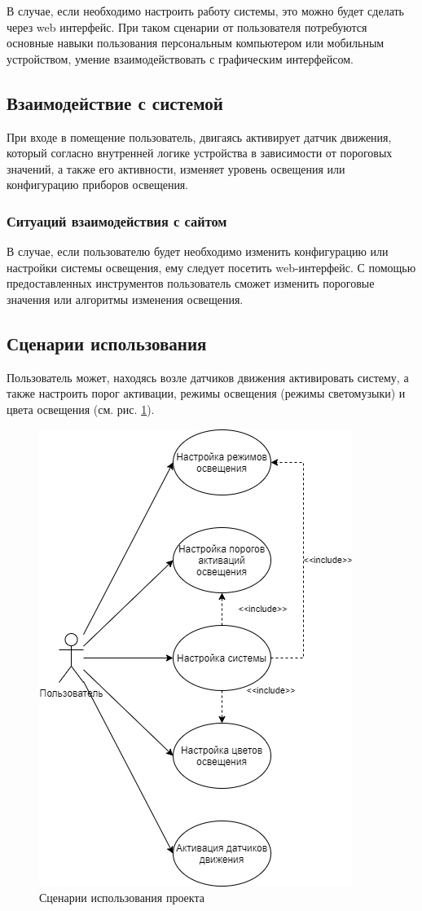 \documentclass[a4paper,14pt]{extarticle}
\begin{document}
В случае, если необходимо настроить работу системы, это можно будет сделать через web интерфейс. При таком сценарии от пользователя потребуются основные навыки пользования персональным компьютером или мобильным устройством, умение взаимодействовать с графическим интерфейсом.
\subsection{Взаимодействие с системой}

При входе в помещение пользователь, двигаясь активирует датчик движения, который согласно внутренней логике устройства в зависимости от пороговых значений, а также его активности, изменяет уровень освещения или конфигурацию приборов освещения.

\subsubsection*{Ситуаций взаимодействия с сайтом}
В случае, если пользователю будет необходимо изменить конфигурацию или настройки системы освещения, ему следует посетить web-интерфейс. С помощью предоставленных инструментов пользователь сможет изменить пороговые значения или алгоритмы изменения освещения.

\subsection{Сценарии использования}
Пользователь может, находясь возле датчиков движения активировать систему, а также настроить порог активации, режимы освещения (режимы светомузыки) и цвета освещения (см. рис. \ref{fig:usecase}).

\begin{figure}[htbp]
	\centering
	\includegraphics[width=0.5\linewidth]{images/usecase}
	\caption{Сценарии использования проекта}
	\label{fig:usecase}
\end{figure}
\newpage
\end{document}
